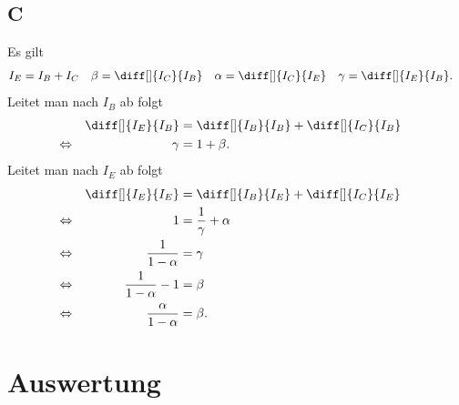 \documentclass[a4paper,12pt]{article}
\numberwithin{equation}{section}
\begin{document}
\subsection{C}
Es gilt 
\begin{align} 
        I_E&=I_B+I_C&\beta &=\diff[]{I_C}{I_B}&\alpha &=\diff[]{I_C}{I_E}&\gamma &=\diff[]{I_E}{I_B}
.\end{align} 
Leitet man nach $I_B$ ab folgt 
\begin{align} 
        &&\diff[]{I_E}{I_B}&=\diff[]{I_B}{I_B}+\diff[]{I_C}{I_B}&&\\
        \Leftrightarrow &&\gamma &=1+\beta .&&
\end{align} 
Leitet man nach $I_E$ ab folgt
\begin{align} 
        &&\diff[]{I_E}{I_E}&=\diff[]{I_B}{I_E}+\diff[]{I_C}{I_E}&&\\
        \Leftrightarrow &&1&=\dfrac{1}{\gamma }+\alpha &&\nonumber \\
        \Leftrightarrow &&\dfrac{1}{1-\alpha }&=\gamma &&\nonumber \\
        \Leftrightarrow &&\dfrac{1}{1-\alpha }-1&=\beta &&\nonumber \\
        \Leftrightarrow &&\dfrac{\alpha }{1-\alpha }&=\beta .&&
\end{align} 


\clearpage
\section{Auswertung}

\clearpage
\listoffigures
\listoftables



\end{document}
